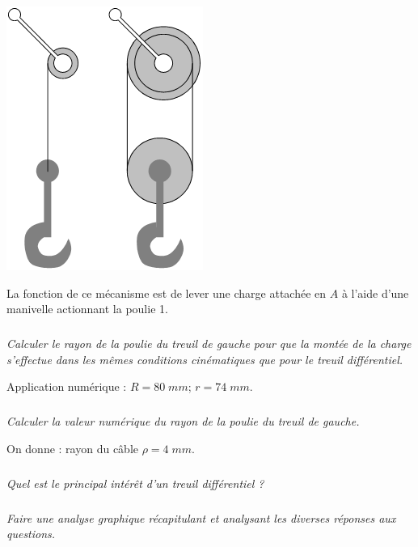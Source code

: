 \documentclass[10pt]{article}
\begin{document}
\begin{minipage}[c]{.2\linewidth}
\begin{center}
\includegraphics[width=.95\textwidth]{images/treuil_2}
\end{center}
\end{minipage} \hfill
\begin{minipage}[c]{.75\linewidth}
La fonction de ce mécanisme est de lever une charge attachée en $A$ à l'aide d'une manivelle actionnant 
la poulie 1.


\subparagraph{}
\textit{Calculer le rayon de la poulie du treuil de gauche pour que la montée de la charge s'effectue dans les mêmes conditions cinématiques que pour le treuil différentiel.}

Application numérique : $R=80\;mm$; $r=74\;mm$.

\subparagraph{}
\textit{Calculer la valeur numérique du rayon de la poulie du treuil de gauche.}

On donne : rayon du câble $\rho=4\;mm$. 

\subparagraph{}
\textit{Quel est le principal intérêt d'un treuil différentiel ?}

\subparagraph{}
\textit{Faire une analyse graphique récapitulant et analysant les diverses réponses aux questions.}


\end{minipage}
\end{document}
